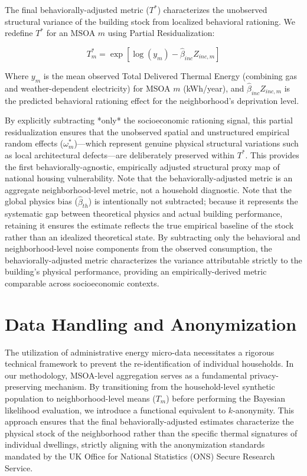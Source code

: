 \documentclass[11pt, a4paper, twocolumn, numbers]{elsarticle}
\begin{document}
The final behaviorally-adjusted metric (\(T^*\)) characterizes the unobserved structural variance of the building stock from localized behavioral rationing. We redefine \(T^*\) for an MSOA \(m\) using Partial Residualization:

\begin{equation}
T^*_{m} = \exp \left[ \log(y_{m}) - \hat{\beta}_{inc} Z_{inc, m} \right]
\end{equation}

Where \(y_{m}\) is the mean observed Total Delivered Thermal Energy (combining gas and weather-dependent electricity) for MSOA \(m\) (kWh/year), and \(\hat{\beta}_{inc} Z_{inc, m}\) is the predicted behavioral rationing effect for the neighborhood's deprivation level. 

By explicitly subtracting *only* the socioeconomic rationing signal, this partial residualization ensures that the unobserved spatial and unstructured empirical random effects ($\omega^*_m$)—which represent genuine physical structural variations such as local architectural defects—are deliberately preserved within $T^*$. This provides the first behaviorally-agnostic, empirically adjusted structural proxy map of national housing vulnerability. Note that the behaviorally-adjusted metric is an aggregate neighborhood-level metric, not a household diagnostic.
 Note that the global physics bias 
(\(\hat{\beta}_{th}\)) is intentionally not subtracted; because it 
represents the systematic gap between theoretical physics and actual 
building performance, retaining it ensures the estimate reflects the true 
empirical baseline of the stock rather than an idealized theoretical 
state. By subtracting only the behavioral and neighborhood-level noise 
components from the observed consumption, the behaviorally-adjusted metric characterizes the variance 
attributable strictly to the building's physical performance, providing 
an empirically-derived metric comparable across socioeconomic contexts.

\section{Data Handling and Anonymization}\label{data-handling}

The utilization of administrative energy micro-data necessitates a 
rigorous technical framework to prevent the re-identification of 
individual households. In our methodology, MSOA-level aggregation serves 
as a fundamental privacy-preserving mechanism. By transitioning from the 
household-level synthetic population to neighborhood-level means (\(T_m\)) 
before performing the Bayesian likelihood evaluation, we introduce a 
functional equivalent to $k$-anonymity. This approach ensures that the final behaviorally-adjusted estimates characterize the physical stock of the neighborhood rather than the specific thermal signatures of individual dwellings, strictly aligning with the anonymization standards mandated by the UK Office for National Statistics (ONS) Secure Research Service.
\end{document}
